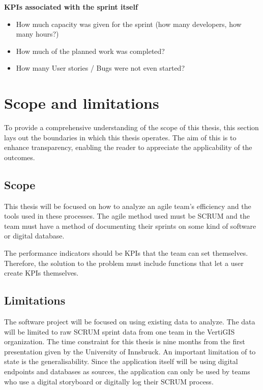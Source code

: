\textbf{KPIs associated with the sprint itself}

\begin{itemize}
    \item How much capacity was given for the sprint (how many developers, how many hours?)
    \item How much of the planned work was completed?
    \item How many User stories / Bugs were not even started?
\end{itemize}

\section{Scope and limitations}

To provide a comprehensive understanding of the scope of this thesis, 
this section lays out the boundaries in which this thesis operates. 
The aim of this is to enhance transparency, enabling the reader to appreciate the applicability of the outcomes.

\subsection{Scope}

This thesis will be focused on how to analyze an agile team's efficiency and the tools used in these processes. 
The agile method used must be SCRUM and the team must have a method of documenting 
their sprints on some kind of software or digital database. 

The performance indicators should be KPIs that the team can set themselves. 
Therefore, the solution to the problem must include functions that let a user create KPIs themselves.

\subsection{Limitations}

The software project will be focused on using existing data to analyze. 
The data will be limited to raw SCRUM sprint data from one team in the VertiGIS organization.
The time constraint for this thesis is nine months from the first presentation given by the University of Innsbruck. 
An important limitation of to state is the generalisability. Since the application itself will be using digital endpoints 
and databases as sources, the application can only be used by teams who use a digital storyboard or digitally log their SCRUM process.


